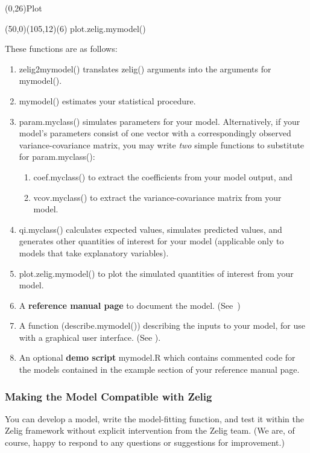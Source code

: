 \documentclass[letterpaper,10pt,english]{sphinxmanual}
\begin{document}
(0,26)Plot

(50,0)(105,12)(6) plot.zelig.mymodel()

These functions are as follows:
\begin{enumerate}
\item {} 
zelig2mymodel() translates zelig() arguments into the arguments for
mymodel().

\item {} 
mymodel() estimates your statistical procedure.

\item {} 
param.myclass() simulates parameters for your model. Alternatively,
if your model’s parameters consist of one vector with a
correspondingly observed variance-covariance matrix, you may write
\emph{two} simple functions to substitute for param.myclass():
\begin{enumerate}
\item {} 
coef.myclass() to extract the coefficients from your model output,
and

\item {} 
vcov.myclass() to extract the variance-covariance matrix from your
model.

\end{enumerate}

\item {} 
qi.myclass() calculates expected values, simulates predicted values,
and generates other quantities of interest for your model (applicable
only to models that take explanatory variables).

\item {} 
plot.zelig.mymodel() to plot the simulated quantities of interest
from your model.

\item {} 
A \textbf{reference manual page} to document the model. (See )

\item {} 
A function (describe.mymodel()) describing the inputs to your model,
for use with a graphical user interface. (See ).

\item {} 
An optional \textbf{demo script} mymodel.R which contains commented code
for the models contained in the example section of your reference
manual page.

\end{enumerate}


\subsubsection{Making the Model Compatible with Zelig}
\label{docs/dev_guide:making-the-model-compatible-with-zelig}
You can develop a model, write the model-fitting function, and test it
within the Zelig framework without explicit intervention from the Zelig
team. (We are, of course, happy to respond to any questions or
suggestions for improvement.)
\end{document}
